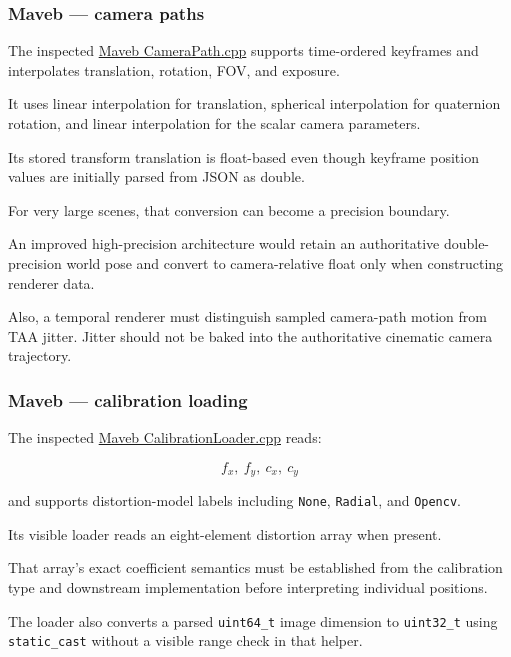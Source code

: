 \subsubsection{Maveb --- camera paths}\label{02-foundations-ii-ch037-maveb-camera-paths}

The inspected \href{https://github.com/swayam8624/Maveb/blob/main/engine/scene/src/CameraPath.cpp?utm_source=chatgpt.com}{Maveb CameraPath.cpp} supports time-ordered keyframes and interpolates translation, rotation, FOV, and exposure.

It uses linear interpolation for translation, spherical interpolation for quaternion rotation, and linear interpolation for the scalar camera parameters.

Its stored transform translation is float-based even though keyframe position values are initially parsed from JSON as double.

For very large scenes, that conversion can become a precision boundary.

An improved high-precision architecture would retain an authoritative double-precision world pose and convert to camera-relative float only when constructing renderer data.

Also, a temporal renderer must distinguish sampled camera-path motion from TAA jitter. Jitter should not be baked into the authoritative cinematic camera trajectory.

\subsubsection{Maveb --- calibration loading}\label{02-foundations-ii-ch037-maveb-calibration-loading}

The inspected \href{https://github.com/swayam8624/Maveb/blob/main/engine/capture/calibration/CalibrationLoader.cpp?utm_source=chatgpt.com}{Maveb CalibrationLoader.cpp} reads:

\[
 f_x,\ f_y,\ c_x,\ c_y
\]

and supports distortion-model labels including \texttt{None}, \texttt{Radial}, and \texttt{Opencv}.

Its visible loader reads an eight-element distortion array when present.

That array's exact coefficient semantics must be established from the calibration type and downstream implementation before interpreting individual positions.

The loader also converts a parsed \texttt{uint64\_t} image dimension to \texttt{uint32\_t} using \texttt{static\_cast} without a visible range check in that helper.

